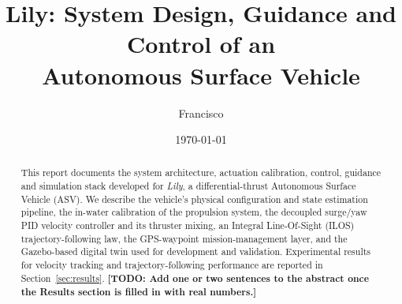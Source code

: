 \documentclass[11pt,a4paper]{article}
\title{\textbf{Lily}: System Design, Guidance and Control of an\\ Autonomous Surface Vehicle}
\author{Francisco \\ \todored{Course name, institution and instructor -- fill in}}
\date{\today}
\newcommand{\todored}[1]{{\color{red}\textbf{[TODO: #1]}}}
\begin{document}
\maketitle

\begin{abstract}
This report documents the system architecture, actuation calibration, control, guidance and simulation stack developed for \textit{Lily}, a differential-thrust Autonomous Surface Vehicle (ASV). We describe the vehicle's physical configuration and state estimation pipeline, the in-water calibration of the propulsion system, the decoupled surge/yaw PID velocity controller and its thruster mixing, an Integral Line-Of-Sight (ILOS) trajectory-following law, the GPS-waypoint mission-management layer, and the Gazebo-based digital twin used for development and validation. Experimental results for velocity tracking and trajectory-following performance are reported in Section~\ref{sec:results}. \todored{Add one or two sentences to the abstract once the Results section is filled in with real numbers.}
\end{abstract}

\tableofcontents
\newpage










\end{document}
